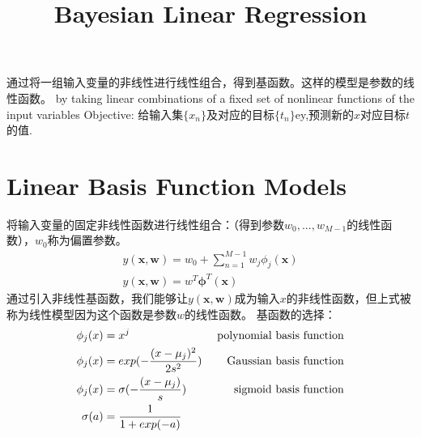 \documentclass[a4paper]{article}
\begin{document}
\title{Bayesian Linear Regression}
\author{}
\maketitle



通过将一组输入变量的非线性进行线性组合，得到基函数。这样的模型是参数的线性函数。
by taking linear combinations of a fixed set of nonlinear functions of the input variables
Objective:
给输入集$\{x_n\}$及对应的目标$\{t_n\}$ey,预测新的$x$对应目标$t$的值.

\section{Linear Basis Function Models}
将输入变量的固定非线性函数进行线性组合：（得到参数$w_0,...,w_{M-1}$的线性函数），$w_0$称为偏置参数。
\begin{align*}
  y(\mathbf{x},\mathbf{w}) = w_0 + \sum_{n=1}^{M-1} w_j\phi_j(\mathbf{x})\\
  y(\mathbf{x},\mathbf{w}) = w^T \boldsymbol{\phi}^T(\mathbf{x})
\end{align*}
通过引入非线性基函数，我们能够让$y(\mathbf{x},\mathbf{w})$成为输入$x$的非线性函数，但上式被称为线性模型因为这个函数是参数$w$的线性函数。
基函数的选择：
\begin{align*}
  \phi_j(x) &= x^j &\text{ polynomial basis function}\\
  \phi_j(x) &= exp(-{(x-\mu_j)^2 \over 2s^2 }) &\text{ Gaussian basis function}\\
  \phi_j(x) &= \sigma(-{(x-\mu_j) \over s }) &\text{  sigmoid basis function}\\
  \sigma(a) &= {1 \over 1+exp(-a)}
\end{align*}
\end{document}
